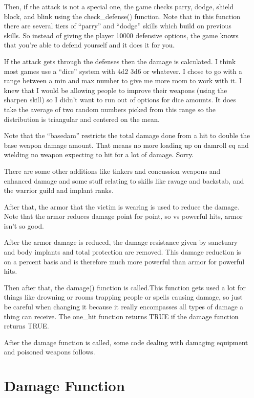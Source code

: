 Then, if the attack is not a special one, the game checks parry,
dodge, shield block, and blink using the check\_defense() function.
Note that in this function there are several tiers of ``parry''
and ``dodge'' skills which build on previous skills. So instead of
giving the player 10000 defensive options, the game knows that
you're able to defend yourself and it does it for you.

If the attack gets through the defenses then the damage is calculated.
I think most games use a ``dice'' system with 4d2 3d6 or whatever. I chose
to go with a range between a min and max number to give me more 
room to work with it. I knew that I would be allowing people to improve
their weapons (using the sharpen skill) so I didn't want to run out of
options for dice amounts. It does take the average of two random numbers
picked from this range so the distribution is triangular and centered
on the mean. 

Note that the ``basedam'' restricts the total damage done from a hit
to double the base weapon damage amount. That means no more loading 
up on damroll eq and wielding no weapon expecting to hit for
a lot of damage. Sorry.

There are some other additions like tinkers and concussion weapons
and enhanced damage and some stuff relating to skills like ravage
and backstab, and the warrior guild and implant ranks.

After that, the armor that the victim is wearing is used to
reduce the damage. Note that the armor reduces damage point
for point, so vs powerful hits, armor isn't so good.

After the armor damage is reduced, the damage resistance
given by sanctuary and body implants and total protection 
are removed. This damage reduction is on a percent basis
and is therefore much more powerful than armor for powerful
hits. 

Then after that, the damage() function is called.This function gets used a lot for things like drowning or rooms
trapping people or spells causing damage, so just be careful when
changing it because it really encompasses all types of damage a thing
can receive. The one\_hit function returns TRUE if the damage function
returns TRUE.

After the damage function is called, some code dealing with damaging
equipment and poisoned weapons follows.




\section{Damage Function}

